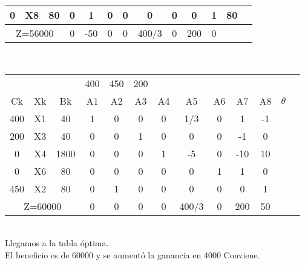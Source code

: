 \documentclass{article}
\begin{document}
\begin{enumerate}
\begin{tabular}{|c  c  c | c  c  c  c  c  c  c  c  c | c |}
			 0 & X8 & 80   & 0 & 1   & 0 & 0 & 0  & 0 & 0   & 1 & 80\\ \hline
			 \multicolumn{3}{|c|}{Z=56000} & 0 & -50 & 0 & 0 & 400/3 & 0 & 200 & 0 &\\ \hline
		\end{tabular}
     	\smallskip\\
		\begin{tabular}{|c  c  c | c  c  c  c  c  c  c  c  c | c |}
			\hline
			 \multicolumn{3}{|c|}{} & 400 & 450 & 200 & & & & & & \\ 
			 Ck  & Xk & Bk   & A1 & A2 & A3 & A4 & A5 & A6 & A7 & A8 & $\theta$\\ \hline 
			 400 & X1 & 40  & 1  & 0   & 0 & 0 & 1/3 & 0  & 1   & -1    & \\
			 200 & X3 & 40   & 0  & 0   & 1 & 0 & 0   & 0  & -1  & 0     & \\
			 0   & X4 & 1800 & 0  & 0   & 0 & 1 & -5  & 0  & -10 & 10    & \\ 
			 0   & X6 & 80   & 0  & 0   & 0 & 0 & 0   & 1  & 1   & 0     & \\
			 450   & X2 & 80   & 0  & 1   & 0 & 0 & 0   & 0  & 0   & 1     & \\ \hline
			 \multicolumn{3}{|c|}{Z=60000} & 0 & 0  & 0  & 0   & 400/3 & 0 & 200 & 50 &\\ \hline
		\end{tabular}
     	\smallskip\\
     	
		Llegamos a la tabla \'optima.\\
		El beneficio es de 60000 y se aumentó la ganancia en 4000 \Rightarrow   Conviene.\\
     	
\end{enumerate}
\end{document}
